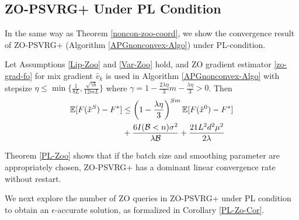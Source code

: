 \subsection{ZO-PSVRG+ Under PL Condition}
In the same way as Theorem \ref{noncon-zoo-coord}, we show the convergence result of ZO-PSVRG+ (Algorithm \ref{APGnonconvex-Algo}) under PL-condition. 
\iffalse
Particularly, we present a generic convergence setting for enhancing the convergence rate for  existing SZO algorithms for functions under PL condition using variance reduced methods. It is worth noting that for functions satisfying PL condition (i.e. \eqref{zo-pl-cond} holds), ZO-PSVRG+ can immediately use the final iteration $\tilde{x}^S$
as the output point rather than using a randomly chosen
$\hat{x}$. 
The following theorem provides the convergence guarantee for ZO-PSVRG+ under PL condition.
\fi
\begin{theorem}\label{PL-Zoo}
Let Assumptions \ref{Lip-Zoo} and \ref{Var-Zoo} hold, and  ZO gradient estimator \eqref{zo-grad-fo} for mix gradient $\hat{v}_k$ is  used  in  Algorithm \ref{APGnonconvex-Algo} with stepsize $\eta \leq \min\{\frac{1}{8L}, \frac{\sqrt{\gamma b}}{12 m L }\}$ where $\gamma = 1-\frac{2\lambda\eta}{3} m-\frac{\lambda\eta}{3} > 0$. Then 
\begin{align}
\mathbb{E}[F(\tilde{x}^S) - {F}^*] & \leq   \left(1-\frac{\lambda\eta}{3}\right)^{Sm} \mathbb{E}[F(\tilde{x}^0) - {F}^*]\notag\\
& + \frac{6I(\mathcal{B} < n) \sigma ^2}{\lambda \mathcal{B}}+\frac{21 L^2 d^2 \mu^2}{2\lambda}\label{PL-eq-error}
\end{align}
\end{theorem}
Theorem \ref{PL-Zoo} shows that if the batch size and smoothing parameter are  appropriately chosen, ZO-PSVRG+ has a dominant linear convergence rate without restart. 
\iffalse
Further, comparing with Theorem \ref{noncon-zoo-coord}, it is evident from \eqref{PL-eq-error} that the  error term $\frac{6I(\mathcal{B} < n) \sigma ^2}{\mathcal{B}}+\frac{7L^2 d^2 \mu^2}{2}$ is amplified by the factor $1/\lambda$. Thus, the error induced by these terms will be improved if $\lambda >> 1$.
\fi
We next explore the number of ZO queries in ZO-PSVRG+ under PL condition to obtain an $\epsilon$-accurate solution, as formalized in Corollary \ref{PL-Zo-Cor}. 
